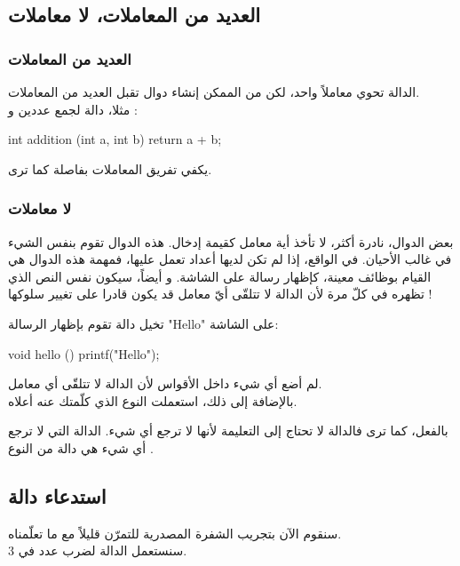 \subsection{العديد من المعاملات، لا معاملات}

\subsubsection{العديد من المعاملات}

الدالة
تحوي معاملاً واحد، لكن من الممكن إنشاء دوال تقبل العديد من المعاملات.\\
مثلا، دالة 
لجمع عددين
و 
 :

\begin{Csource}
int addition (int a, int b)
{
	return a + b;
}
\end{Csource}

يكفي تفريق المعاملات بفاصلة كما ترى.

\subsubsection{لا معاملات}

بعض الدوال، نادرة أكثر، لا تأخذ أية معامل كقيمة إدخال. هذه الدوال تقوم بنفس الشيء في غالب الأحيان. في الواقع، إذا لم تكن لديها أعداد تعمل عليها، فمهمة هذه الدوال هي القيام بوظائف معينة، كإظهار رسالة على الشاشة. و أيضاً، سيكون نفس النص الذي تظهره في كلّ مرة لأن الدالة لا تتلقّى أيّ معامل قد يكون قادرا على تغيير سلوكها !

تخيل دالة
تقوم بإظهار الرسالة
"\textenglish{Hello}"
على الشاشة:

\begin{Csource}
void hello ()
{
	printf("Hello");
}
\end{Csource}

لم أضع أي شيء داخل الأقواس لأن الدالة لا تتلقّى أي معامل.\\
بالإضافة إلى ذلك، استعملت النوع 
الذي كلّمتك عنه أعلاه.

بالفعل، كما ترى فالدالة لا تحتاج إلى التعليمة 
لأنها لا ترجع أي شيء. الدالة التي لا ترجع أي شيء هي دالة من النوع
.

\subsection{استدعاء دالة}

سنقوم الآن بتجريب الشفرة المصدرية للتمرّن قليلاً مع ما تعلّمناه.\\
سنستعمل الدالة 
لضرب عدد في 3.

